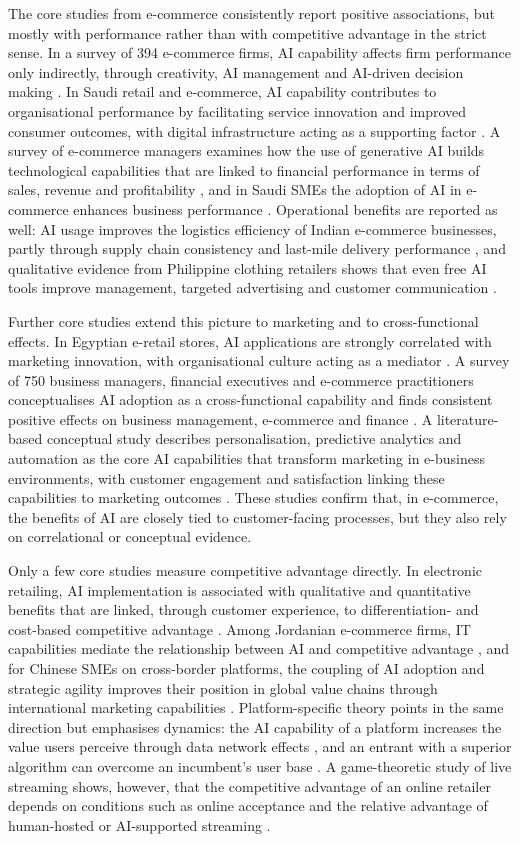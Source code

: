 The core studies from e-commerce consistently report positive associations, but mostly with performance rather than with competitive advantage in the strict sense. In a survey of 394 e-commerce firms, AI capability affects firm performance only indirectly, through creativity, AI management and AI-driven decision making . In Saudi retail and e-commerce, AI capability contributes to organisational performance by facilitating service innovation and improved consumer outcomes, with digital infrastructure acting as a supporting factor . A survey of e-commerce managers examines how the use of generative AI builds technological capabilities that are linked to financial performance in terms of sales, revenue and profitability , and in Saudi SMEs the adoption of AI in e-commerce enhances business performance . Operational benefits are reported as well: AI usage improves the logistics efficiency of Indian e-commerce businesses, partly through supply chain consistency and last-mile delivery performance , and qualitative evidence from Philippine clothing retailers shows that even free AI tools improve management, targeted advertising and customer communication .

Further core studies extend this picture to marketing and to cross-functional effects. In Egyptian e-retail stores, AI applications are strongly correlated with marketing innovation, with organisational culture acting as a mediator . A survey of 750 business managers, financial executives and e-commerce practitioners conceptualises AI adoption as a cross-functional capability and finds consistent positive effects on business management, e-commerce and finance . A literature-based conceptual study describes personalisation, predictive analytics and automation as the core AI capabilities that transform marketing in e-business environments, with customer engagement and satisfaction linking these capabilities to marketing outcomes . These studies confirm that, in e-commerce, the benefits of AI are closely tied to customer-facing processes, but they also rely on correlational or conceptual evidence.

Only a few core studies measure competitive advantage directly. In electronic retailing, AI implementation is associated with qualitative and quantitative benefits that are linked, through customer experience, to differentiation- and cost-based competitive advantage . Among Jordanian e-commerce firms, IT capabilities mediate the relationship between AI and competitive advantage , and for Chinese SMEs on cross-border platforms, the coupling of AI adoption and strategic agility improves their position in global value chains through international marketing capabilities . Platform-specific theory points in the same direction but emphasises dynamics: the AI capability of a platform increases the value users perceive through data network effects , and an entrant with a superior algorithm can overcome an incumbent's user base . A game-theoretic study of live streaming shows, however, that the competitive advantage of an online retailer depends on conditions such as online acceptance and the relative advantage of human-hosted or AI-supported streaming .

